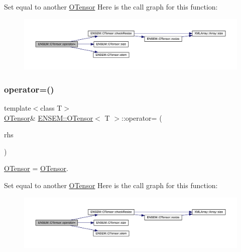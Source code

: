 Set equal to another \mbox{\hyperlink{classENSEM_1_1OTensor}{O\+Tensor}} Here is the call graph for this function\+:
\nopagebreak
\begin{figure}[H]
\begin{center}
\leavevmode
\includegraphics[width=350pt]{da/d8a/classENSEM_1_1OTensor_a08690a1808269fccd113a9d634c7a73f_cgraph}
\end{center}
\end{figure}
\mbox{\label{classENSEM_1_1OTensor_a08690a1808269fccd113a9d634c7a73f}} 
\subsubsection{\texorpdfstring{operator=()}{operator=()}\hspace{0.1cm}{\footnotesize\ttfamily [6/8]}}
{\footnotesize\ttfamily template$<$class T$>$ \\
\mbox{\hyperlink{classENSEM_1_1OTensor}{O\+Tensor}}\& \mbox{\hyperlink{classENSEM_1_1OTensor}{E\+N\+S\+E\+M\+::\+O\+Tensor}}$<$ T $>$\+::operator= (\begin{DoxyParamCaption}\item[{const \mbox{\hyperlink{classENSEM_1_1OTensor}{O\+Tensor}}$<$ T $>$ \&}]{rhs }\end{DoxyParamCaption})\hspace{0.3cm}{\ttfamily [inline]}}



\mbox{\hyperlink{classENSEM_1_1OTensor}{O\+Tensor}} = \mbox{\hyperlink{classENSEM_1_1OTensor}{O\+Tensor}}. 

Set equal to another \mbox{\hyperlink{classENSEM_1_1OTensor}{O\+Tensor}} Here is the call graph for this function\+:
\nopagebreak
\begin{figure}[H]
\begin{center}
\leavevmode
\includegraphics[width=350pt]{da/d8a/classENSEM_1_1OTensor_a08690a1808269fccd113a9d634c7a73f_cgraph}
\end{center}
\end{figure}
\mbox{\label{classENSEM_1_1OTensor_a96fac7277ac1df849789d53b761e5e68}} 
